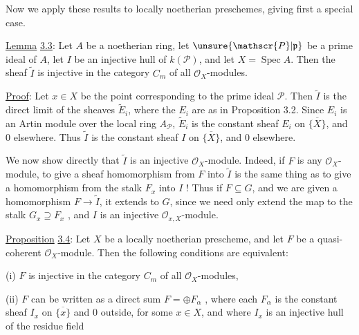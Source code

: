 Now we apply these results to locally noetherian preschemes, giving first a special case.

\uline{Lemma} \uline{3.3}: Let $A$ be a noetherian ring, let $\unsure{\mathscr{P}|\mathfrak{p}}$ be a prime ideal of $A$, let $I$ be an injective hull of $k(\mathscr{P})$, and let $X=\operatorname{Spec} A$. Then the sheaf $\widetilde{I}$ is injective in the category $C_m$ of all $\mathscr{O}_X$-modules.

\uline{Proof}: Let $x\in X$ be the point corresponding to the prime ideal $\mathscr{P}$. Then $\widetilde{I}$ is the direct limit of the sheaves $\widetilde{E}_i$, where the $E_i$ are as in Proposition 3.2. Since $E_i$ is an Artin module over the local ring $A_{\mathscr{P}}$, $\widetilde{E}_i$ is the constant sheaf $E_i$ on $\overline{\{X\}}$, and $0$ elsewhere. Thus $\widetilde{I}$ is the constant sheaf $I$ on $\overline{\{X\}}$, and $0$ elsewhere.

We now show directly that $\widetilde{I}$ is an injective $\mathscr{O}_X$-module. Indeed, if $F$ is any $\mathscr{O}_X$-module, to give a sheaf homomorphism from $F$ into $\widetilde{I}$ is the same thing as to give a homomorphism from the stalk $F_x$ into $I$ ! Thus if $F\subseteq G$, and we are given a homomorphism $F\longrightarrow\widetilde{I}$, it extends to $G$, since we need only extend the map to the stalk $G_x\supseteq F_x$ , and $I$ is an injective $\mathscr{O}_{x,X}$-module.

\uline{Proposition} \uline{3.4}: Let $X$ be a locally noetherian prescheme, and let $F$ be a quasi-coherent $\mathscr{O}_X$-module. Then the following conditions are equivalent:

(i) $F$ is injective in the category $C_m$ of all $\mathscr{O}_X$-modules,

(ii) $F$ can be written as a direct sum $F=\oplus F_\alpha$ , where each $F_\alpha$ is the constant sheaf $I_x$ on $\overline{\{x\}}$ and $0$ outside, for some $x\in X$, and where $I_x$ is an injective hull of the residue field

